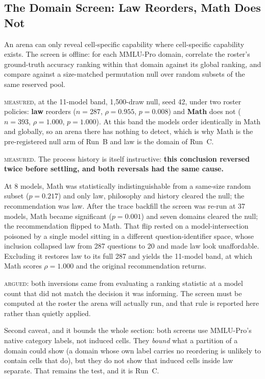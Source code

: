 \subsection{The Domain Screen: Law Reorders, Math Does Not}\label{sec:res-law}

An arena can only reveal cell-specific capability where cell-specific
capability exists. The screen is offline: for each MMLU-Pro domain,
correlate the roster's ground-truth accuracy ranking within that domain
against its global ranking, and compare against a size-matched
permutation null over random subsets of the same reserved pool.

\textsc{measured}, at the 11-model band, 1{,}500-draw null, seed 42,
under two roster policies: \textbf{law} reorders
($n = 287$, $\rho = 0.955$, $p = 0.008$) and \textbf{Math} does not
($n = 393$, $\rho = 1.000$, $p = 1.000$). At this band the models order
identically in Math and globally, so an arena there has nothing to
detect, which is why Math is the pre-registered null arm of Run~B
and law is the domain of Run~C.

\textsc{measured}. The process history is itself instructive:
\textbf{this conclusion reversed twice before settling, and both
reversals had the same cause.}

At 8 models, Math was statistically indistinguishable from a same-size
random subset ($p = 0.217$) and only law, philosophy and history cleared
the null; the recommendation was law. After the trace backfill the
screen was re-run at 37 models, Math became significant
($p = 0.001$) and seven domains cleared the null; the recommendation
flipped to Math. That flip rested on a model-intersection poisoned by a
single model sitting in a different question-identifier space, whose
inclusion collapsed law from 287 questions to 20 and made law look
unaffordable. Excluding it restores law to its full 287 and yields the
11-model band, at which Math scores $\rho = 1.000$ and the original
recommendation returns.

\textsc{argued}: both inversions came from evaluating a ranking
statistic at a model count that did not match the decision it was
informing. The screen must be computed at the roster the arena will
actually run, and that rule is reported here rather than quietly
applied.

Second caveat, and it bounds the whole section: both screens use
MMLU-Pro's native category labels, not induced cells. They \emph{bound}
what a partition of a domain could show (a domain whose own label
carries no reordering is unlikely to contain cells that do), but they
do not show that induced cells inside law separate. That remains the
test, and it is Run~C.

